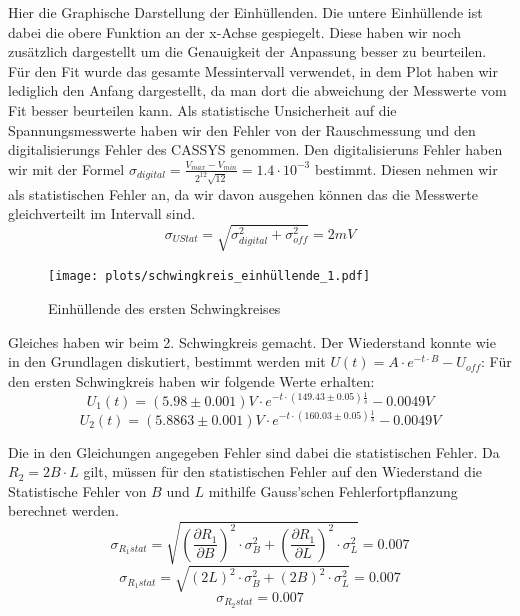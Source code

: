 \documentclass[twoside]{protokoll}
\begin{document}
Hier die Graphische Darstellung der Einhüllenden.
Die untere Einhüllende ist dabei die obere Funktion an der x-Achse gespiegelt.
Diese haben wir noch zusätzlich dargestellt um die Genauigkeit der Anpassung besser zu beurteilen.
Für den Fit wurde das gesamte Messintervall verwendet, in dem Plot haben wir lediglich den Anfang dargestellt, da man dort die abweichung der Messwerte vom Fit besser beurteilen kann.
Als statistische Unsicherheit auf die Spannungsmesswerte haben wir den Fehler von der Rauschmessung und den digitalisierungs Fehler des CASSYS genommen.
Den digitalisieruns Fehler haben wir mit der Formel $ \sigma_{digital} = \frac{V_{max} - V_{min}}{2^{12} \sqrt{12}} = 1.4 \cdot 10^{-3}$ bestimmt.
Diesen nehmen wir als statistischen Fehler an, da wir davon ausgehen können das die Messwerte gleichverteilt im Intervall sind.
\begin{equation}
    \sigma_{U Stat} = \sqrt{ \sigma_{digital}^2 +  \sigma_{off}^2} = 2mV
\end{equation}
\begin{figure}[H]
    \centering
    \texttt{[image: plots/schwingkreis\_einhüllende\_1.pdf]}
    \caption{Einhüllende des ersten Schwingkreises}
\end{figure}

Gleiches haben wir beim 2. Schwingkreis gemacht.
Der Wiederstand konnte wie in den Grundlagen diskutiert, bestimmt werden mit $ U(t) = A \cdot e^{-t \cdot B} - U_{off}$:
Für den ersten Schwingkreis haben wir folgende Werte erhalten:
\begin{equation}
    U_1(t) = (5.98 \pm 0.001)V \cdot e^{-t \cdot (149.43 \pm 0.05) \frac{1}{s} } - 0.0049 V
    \label{U1 Widerstandanpassung}
\end{equation}
\begin{equation}
    U_2(t) = (5.8863 \pm 0.001)V \cdot e^{-t \cdot (160.03 \pm 0.05) \frac{1}{s} } - 0.0049 V
    \label{U2 Widerstandanpassung}
\end{equation}

Die in den Gleichungen angegeben Fehler sind dabei die statistischen Fehler.
Da $R_2 = 2 B \cdot L$ gilt, müssen für den statistischen Fehler auf den Wiederstand die Statistische Fehler von $B$ und $L$ mithilfe Gauss'schen Fehlerfortpflanzung berechnet werden.
\begin{equation}
    \sigma_{R_1 stat} = \sqrt{ \left( \frac{\partial R_1}{\partial B} \right)^2 \cdot \sigma_{B}^2 + \left( \frac{\partial R_1}{\partial L} \right)^2 \cdot \sigma_{L}^2} 
    = 0.007
\end{equation}
\begin{equation}
    \sigma_{R_1 stat} = \sqrt{ \left( 2L \right)^2 \cdot \sigma_{B}^2 + \left( 2 B \right)^2 \cdot \sigma_{L}^2} 
    = 0.007
\end{equation}
\begin{equation}
    \sigma_{R_2 stat} = 0.007
\end{equation}
\end{document}
